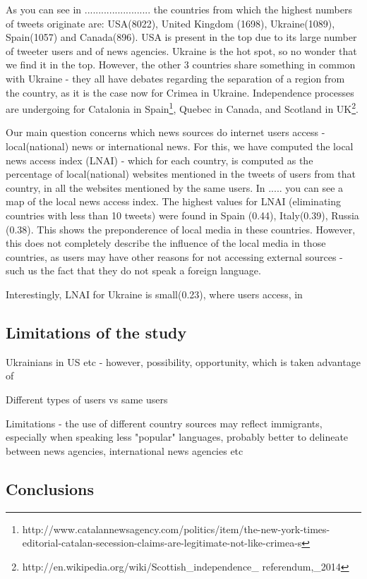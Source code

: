 \documentclass{acm_proc_10ptArticle-sp}
\begin{document}
As you can see in ........................ the countries from which the highest numbers of tweets originate are: USA(8022), United Kingdom (1698), Ukraine(1089), Spain(1057) and Canada(896). USA is present in the top due to its large number of tweeter users and of news agencies. Ukraine is the hot spot, so no wonder that we find it in the top. However, the other 3 countries share something in common with Ukraine - they all have debates regarding the separation of a region from the country, as it is the case now for Crimea in Ukraine. Independence processes are undergoing for Catalonia in Spain\footnote{http://www.catalannewsagency.com/politics/item/the-new-york-times-editorial-catalan-secession-claims-are-legitimate-not-like-crimea-s}, Quebec in Canada, and Scotland in UK\footnote{http://en.wikipedia.org/wiki/Scottish\_independence\_ referendum,\_2014}.

Our main question concerns which news sources do internet users access - local(national) news or international news. For this, we have computed the local news access index (LNAI) - which for each country, is computed as the percentage of local(national) websites mentioned in the tweets of users from that country, in all the websites mentioned by the same users. In ..... you can see a map of the local news access index. The highest values for LNAI (eliminating countries with less than 10 tweets) were found in Spain (0.44), Italy(0.39), Russia (0.38). This shows the preponderence of local media in these countries. However, this does not completely describe the influence of the local media in those countries, as users may have other reasons for not accessing external sources - such us the fact that they do not speak a foreign language. 

Interestingly, LNAI for Ukraine is small(0.23), where users access, in 

\subsection{Limitations of the study}
Ukrainians in US etc - however, possibility, opportunity, which is taken advantage of

Different types of users vs same users

Limitations - the use of different country sources may reflect immigrants, especially when speaking less "popular" languages, probably better to delineate between news agencies, international news agencies etc

\subsection{Conclusions}




\end{document}
